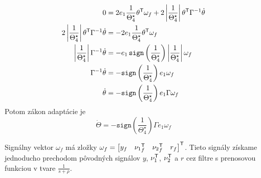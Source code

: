 \documentclass[a4paper, 10pt, ]{article}
\begin{document}
\begin{subequations}
    \begin{align}
    	0 &= 2 e_1 \frac{1}{\Theta_4^\star} \theta^{\mathsf{T}} \omega_f + 2 \left| \frac{1}{\Theta_4^\star} \right| \theta^{\mathsf{T}} \Gamma^{-1} \dot \theta \\
    	2 \left| \frac{1}{\Theta_4^\star} \right| \theta^{\mathsf{T}} \Gamma^{-1} \dot \theta &= - 2 e_1 \frac{1}{\Theta_4^\star} \theta^{\mathsf{T}} \omega_f \\
    	\left| \frac{1}{\Theta_4^\star} \right| \Gamma^{-1} \dot \theta &= - e_1 \, \texttt{sign}\left(\frac{1}{\Theta_4^\star}\right) \left| \frac{1}{\Theta_4^\star} \right| \omega_f \\
    	\Gamma^{-1} \dot \theta &= - \texttt{sign}\left(\frac{1}{\Theta_4^\star}\right) e_1 \omega_f \\
    	\dot\theta &= - \texttt{sign}\left(\frac{1}{\Theta_4^\star}\right) e_1 \Gamma \omega_f
    \end{align}
\end{subequations}
Potom zákon adaptácie je
\begin{equation}
	\dot{\Theta} = - \texttt{sign}\left(\frac{1}{\Theta_4^\star}\right) \Gamma e_1 \omega_f
\end{equation}

Signálny vektor $\omega_f$ má zložky $\omega_f = \begin{bmatrix} y_f & {\nu_1}_f^{\mathsf{T}} & {\nu_2}_f^{\mathsf{T}} & r_f \end{bmatrix}^{\mathsf{T}}$. Tieto signály získame jednoducho prechodom pôvodných signálov $y$, $\nu_1^{\mathsf{T}}$, $\nu_2^{\mathsf{T}}$ a $r$ cez filtre s prenosovou funkciou v tvare $\frac{1}{s+\rho}$.
\end{document}
